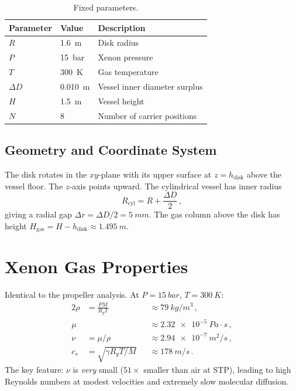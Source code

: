 \documentclass[11pt,a4paper]{article}
\begin{document}
\begin{table}[H]
\centering
\caption{Fixed parameters.}
\label{tab:fixed}
\begin{tabular}{lll}
\toprule
Parameter & Value & Description \\
\midrule
$R$            & \SI{1.6}{m}        & Disk radius \\
$P$            & \SI{15}{bar}       & Xenon pressure \\
$T$            & \SI{300}{K}        & Gas temperature \\
$\Delta D$     & \SI{0.010}{m}      & Vessel inner diameter surplus \\
$H$            & \SI{1.5}{m}        & Vessel height \\
$N$            & 8                  & Number of carrier positions \\
\bottomrule
\end{tabular}
\end{table}

\subsection{Geometry and Coordinate System}

The disk rotates in the $xy$-plane with its upper surface at
$z = h_\mathrm{disk}$ above the vessel floor. The $z$-axis points
upward. The cylindrical vessel has inner radius
\begin{equation}
  R_\mathrm{cyl} = R + \frac{\Delta D}{2}\,,
\end{equation}
giving a radial gap $\Delta r = \Delta D/2 = \SI{5}{mm}$.
The gas column above the disk has height
$H_\mathrm{gas} = H - h_\mathrm{disk} \approx \SI{1.495}{m}$.


\section{Xenon Gas Properties}
\label{sec:gas}

Identical to the propeller analysis. At $P = \SI{15}{bar}$,
$T = \SI{300}{K}$:
\begin{alignat}{2}
  \rho  &= \frac{PM}{R_g T}
        &&\approx \SI{79}{kg/m^3}\,,
  \label{eq:rho}
  \\[4pt]
  \mu   &
        &&\approx \SI{2.32e-5}{Pa\cdot s}\,,
  \\[4pt]
  \nu   &= \mu/\rho
        &&\approx \SI{2.94e-7}{m^2/s}\,,
  \\[4pt]
  c_s   &= \sqrt{\gamma R_g T / M}
        &&\approx \SI{178}{m/s}\,.
\end{alignat}
The key feature: $\nu$ is \emph{very} small ($51\times$ smaller than
air at STP), leading to high Reynolds numbers at modest velocities and
extremely slow molecular diffusion.
\end{document}
